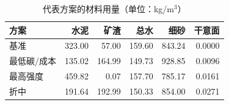 \begin{table}[htbp]
  \centering
  \caption{代表方案的材料用量（单位：kg/m$^3$）}
  \label{tab:masses}
  \begin{tabular}{@{}lrrrrr@{}}
    \toprule
    方案 & 水泥 & 矿渣 & 总水 & 细砂 & 干意面\\
    \midrule
    基准 & 323.00 & 57.00 & 159.60 & 843.24 & 0.0000\\
    最低碳/成本 & 135.02 & 164.99 & 149.73 & 928.85 & 0.0096\\
    最高强度 & 459.82 & 0.07 & 157.70 & 785.17 & 0.0161\\
    折中 & 191.64 & 192.99 & 150.33 & 854.00 & 0.0271\\
    \bottomrule
  \end{tabular}
\end{table}

